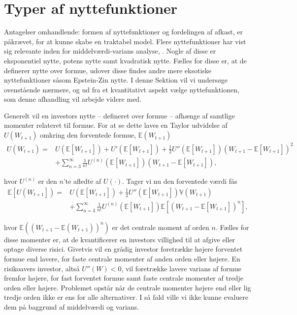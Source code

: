\documentclass[
  a4paper,
  oneside]{memoir}
\begin{document}
\hypertarget{typnyt}{%
\section{Typer af nyttefunktioner}\label{typnyt}}

Antagelser omhandlende: formen af nyttefunktioner og fordelingen af afkast, er påkrævet, for at kunne skabe en traktabel model. Flere nyttefunktioner har vist sig relevante inden for middelværdi-varians analyse, \citep{CampVic2003}. Nogle af disse er eksponentiel nytte, potens nytte samt kvadratisk nytte. Fælles for disse er, at de definerer nytte over formue, udover disse findes andre mere eksotiske nyttefunktioner såsom Epstein-Zin nytte. I denne Sektion vil vi undersøge ovenstående nærmere, og ud fra et kvantitativt aspekt vælge nyttefunktionen, som denne afhandling vil arbejde videre med.

Generelt vil en investors nytte -- defineret over formue -- afhænge af samtlige momenter relateret til formue. For at se dette laves en Taylor udvidelse af \(U(W_{t+1})\) omkring den forventede formue, \(\mathbb{E}(W_{t+1})\)
\begin{align*}
U\left(W_{t+1}\right)=&U\left(\mathbb{E}\left[W_{t+1}\right]\right)+U'\left(\mathbb{E}\left[W_{t+1}\right]\right)+\frac{1}{2}U''\left(\mathbb{E}\left[W_{t+1}\right]\right)\left(W_{t+1}-\mathbb{E}\left[W_{t+1}\right]\right)^2\\
&+\sum_{n=3}^\infty \frac{1}{n!}U^{\left(n\right)}\left(\mathbb{E}\left[W_{t+1}\right]\right)\left(W_{t+1}-\mathbb{E}\left[W_{t+1}\right]\right),
\end{align*}

hvor \(U^{(n)}\) er den \(n\)'te afledte af \(U(\cdot)\). Tager vi nu den forventede værdi fås
\begin{align*}
\mathbb{E}\left[U\left(W_{t+1}\right]\right)=&U\left(\mathbb{E}\left[W_{t+1}\right]\right)+\frac{1}{2}U''\left(\mathbb{E}\left[W_{t+1}\right]\right)\mathbb{V}\left(W_{t+1}\right)\\
&+\sum_{n=3}^\infty \frac{1}{n!} U^{\left(n\right)}\left(\mathbb{E}\left[W_{t+1}\right]\right)\mathbb{E}\left[\left(W_{t+1}-\mathbb{E}\left[W_{t+1}\right]\right)^n\right],
\end{align*}

hvor \(\mathbb{E}((W_{t+1}-\mathbb{E}(W_{t+1}))^n)\) er det centrale moment af orden \(n\). Fælles for disse momenter er, at de kvantificerer en investors villighed til at afgive eller optage diverse risici. Givetvis vil en grådig investor foretrække højere forventet formue end lavere, for faste centrale momenter af anden orden eller højere. En risikoavers investor, altså \(U''(W)<0\), vil foretrække lavere varians af formue fremfor højere, for fast forventet formue samt faste centrale momenter af tredje orden eller højere. Problemet opstår når de centrale momenter højere end eller lig tredje orden ikke er ens for alle alternativer. I så fald ville vi ikke kunne evaluere dem på baggrund af middelværdi og varians.
\end{document}
